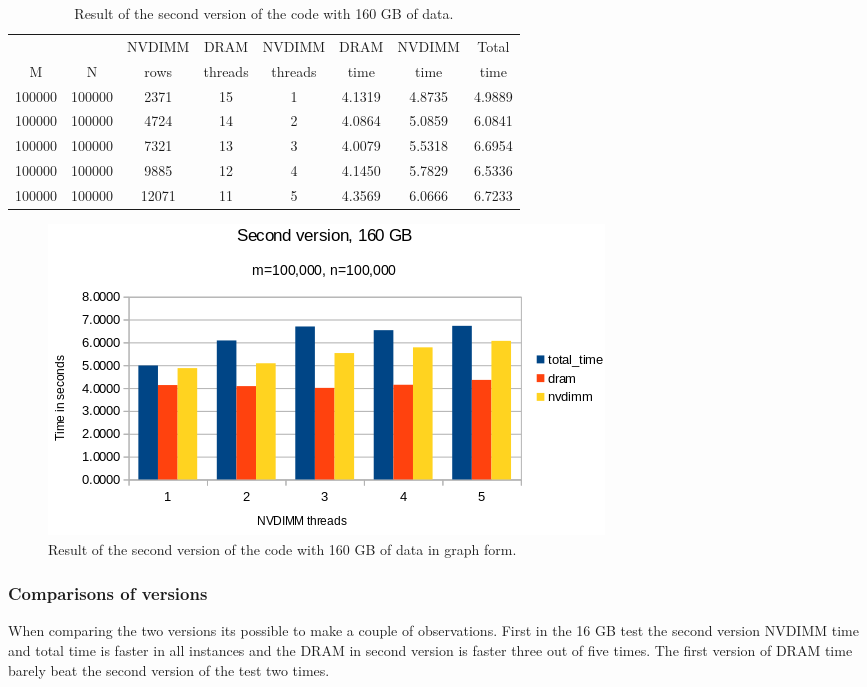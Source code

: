 \documentclass[12pt,a4paper,USenglish]{article}      %
\begin{document}
\begin{table}[!hbtp]
\centering
\begin{tabular}{ |c|c|c|c|c|c|c|c| }
\hline
&  & NVDIMM & DRAM & NVDIMM & DRAM & NVDIMM & Total \\
M & N & rows & threads & threads & time & time & time \\
\hline
100000 & 100000 & 2371 & 15 & 1 & 4.1319 & 4.8735 & 4.9889 \\
\hline
100000 & 100000 & 4724 & 14 & 2 & 4.0864 & 5.0859 & 6.0841 \\
\hline
100000 & 100000 & 7321 & 13 & 3 & 4.0079 & 5.5318 & 6.6954 \\
\hline
100000 & 100000 & 9885 & 12 & 4 & 4.1450 & 5.7829 & 6.5336 \\
\hline
100000 & 100000 & 12071 & 11 & 5 & 4.3569 & 6.0666 & 6.7233 \\
\hline
\end{tabular}
\caption{Result of the second version of the code with 160 GB of data.}
\label{tab:SecondVersion160GB}
\end{table}
\begin{figure}[!hbtp]
\includegraphics[scale=0.7]{Large_Array_test/Second_version_160GB.png}
\caption{Result of the second version of the code with 160 GB of data in graph form.}
\end{figure}

\subsubsection{Comparisons of versions}
When comparing the two versions its possible to make a couple of observations. 
First in the 16 GB test the second version NVDIMM time and total time is faster in all instances and the DRAM in second version is faster three out of five times. The first version of DRAM time barely beat the second version of the test two times. 
\end{document}
